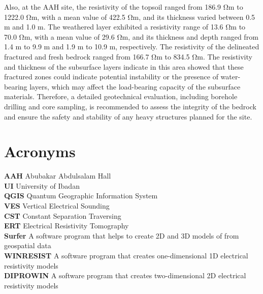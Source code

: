\documentclass[12pt,a4paper]{report}
\begin{document}
Also, at the AAH site, the resistivity of the topsoil ranged from 186.9 Ωm to 1222.0 Ωm, with a mean value of 422.5 Ωm, and its thickness varied between 0.5 m and 1.0 m. The weathered layer exhibited a resistivity range of 13.6 Ωm to 70.0 Ωm, with a mean value of 29.6 Ωm, and its thickness and depth ranged from 1.4 m to 9.9 m and 1.9 m to 10.9 m, respectively. The resistivity of the delineated fractured and fresh bedrock ranged from 166.7 Ωm to 834.5 Ωm. The resistivity and thickness of the subsurface layers indicate in this area showed that these fractured zones could indicate potential instability or the presence of water-bearing layers, which may affect the load-bearing capacity of the subsurface materials. Therefore, a detailed geotechnical evaluation, including borehole drilling and core sampling, is recommended to assess the integrity of the bedrock and ensure the safety and stability of any heavy structures planned for the site.

\tableofcontents

\listoffigures
{}

\listoftables
{}


\chapter*{Acronyms}

\textbf{AAH} \textendash{} Abubakar Abdulsalam Hall \\ [0.5cm]
\textbf{UI} \textendash{} University of Ibadan \\ [0.5cm]
\textbf{QGIS} \textendash{} Quantum Geographic Information System \\ [0.5cm]
\textbf{VES} \textendash{} Vertical Electrical Sounding \\ [0.5cm]
\textbf{CST} \textendash{} Constant Separation Traversing \\ [0.5cm]
\textbf{ERT} \textendash{} Electrical Resistivity Tomography \\ [0.5cm]
\textbf{Surfer} \textendash{} A software program that helps to create 2D and 3D models of from geospatial data \\ [0.5cm]
\textbf{WINRESIST} \textendash{} A software program that creates one-dimensional 1D electrical resistivity models \\ [0.5cm]
\textbf{DIPROWIN} \textendash{} A software program that creates two-dimensional 2D electrical resistivity models
\end{document}
